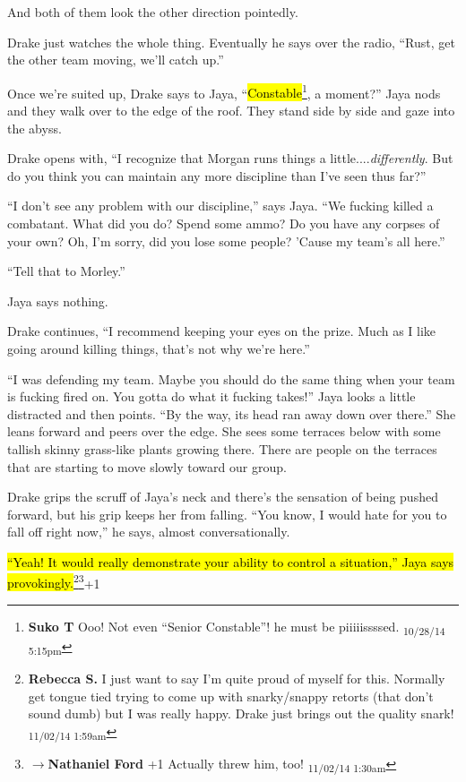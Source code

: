 And both of them look the other direction pointedly.

Drake just watches the whole thing. Eventually he says over the radio, ``Rust, get the other team moving, we'll catch up.''



Once we're suited up, Drake says to Jaya, ``\hl{Constable}\footnote{\textbf{Suko T }Ooo!  Not even ``Senior Constable''!  he must be piiiiissssed. \textsubscript{10/28/14 5:15pm}}, a moment?''  Jaya nods and they walk over to the edge of the roof.  They stand side by side and gaze into the abyss.

Drake opens with, ``I recognize that Morgan runs things a little....\textit{differently}.  But do you think you can maintain any more discipline than I've seen thus far?''

``I don't see any problem with our discipline,'' says Jaya.  ``We fucking killed a combatant.  What did you do?  Spend some ammo?  Do you have any corpses of your own?  Oh, I'm sorry, did you lose some people?  'Cause my team's all here.''

``Tell that to Morley.''

Jaya says nothing.

Drake continues, ``I recommend keeping your eyes on the prize.  Much as I like going around killing things, that's not why we're here.''

``I was defending my team.  Maybe you should do the same thing when your team is fucking fired on.  You gotta do what it fucking takes!''  Jaya looks a little distracted and then points.  ``By the way, its head ran away down over there.''  She leans forward and peers over the edge.  She sees some terraces below with some tallish skinny grass-like plants growing there.  There are people on the terraces that are starting to move slowly toward our group.

Drake grips the scruff of Jaya's neck and there's the sensation of being pushed forward, but his grip keeps her from falling.  ``You know, I would hate for you to fall off right now,'' he says, almost conversationally.

\hl{``Yeah!  It would really demonstrate your ability to control a situation,'' Jaya says provokingly.}\footnote{\textbf{Rebecca S. }I just want to say I'm quite proud of myself for this.  Normally get tongue tied trying to come up with snarky/snappy retorts (that don't sound dumb) but I was really happy.  Drake just brings out the quality snark! \textsubscript{11/02/14 1:59am}}\footnote{$\rightarrow$\textbf{Nathaniel Ford }+1 Actually threw him, too! \textsubscript{11/02/14 1:30am}}+1


